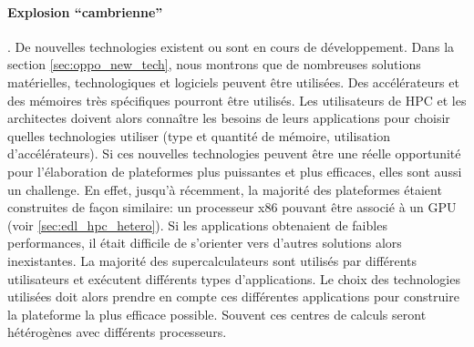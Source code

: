         
        
    
        \paragraph{Explosion ``cambrienne''}. De nouvelles technologies existent ou sont en cours de développement. Dans la section \autoref{sec:oppo_new_tech}, nous montrons que de nombreuses solutions matérielles, technologiques et logiciels peuvent être utilisées. Des accélérateurs et des mémoires très spécifiques pourront être utilisés. Les utilisateurs de HPC et les architectes doivent alors connaître les besoins de leurs applications pour choisir quelles technologies utiliser (type et quantité de mémoire, utilisation d'accélérateurs). Si ces nouvelles technologies peuvent être une réelle opportunité pour l'élaboration de plateformes plus puissantes et plus efficaces, elles sont aussi un challenge. En effet, jusqu’à récemment, la majorité des plateformes étaient construites de façon similaire: un processeur x86 pouvant être associé à un GPU (voir \autoref{sec:edl_hpc_hetero}). Si les applications obtenaient de faibles performances, il était difficile de s'orienter vers d'autres solutions alors inexistantes. La majorité des supercalculateurs sont utilisés par différents utilisateurs et exécutent différents types d'applications. Le choix des technologies utilisées doit alors prendre en compte ces différentes applications pour construire la plateforme la plus efficace possible. Souvent ces centres de calculs seront hétérogènes avec différents processeurs.
        
